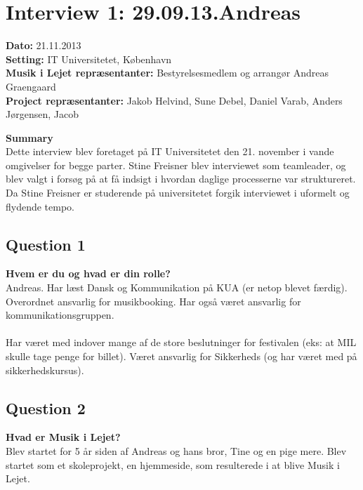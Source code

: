 \section{Interview 1: 29.09.13.Andreas}
\label{interview_1}

\textbf{Dato:} 21.11.2013 \\
\textbf{Setting:} IT Universitetet, København \\
\textbf{Musik i Lejet repræsentanter:} Bestyrelsesmedlem og arrangør Andreas Graengaard  \\
\textbf{Project repræsentanter:} Jakob Helvind, Sune Debel, Daniel Varab, Anders Jørgensen, Jacob 

\bigskip

\noindent \textbf{Summary} \\
Dette interview blev foretaget på IT Universitetet den 21. november i vande omgivelser for begge parter. Stine Freisner blev interviewet som teamleader, og blev valgt i forsøg på at få indsigt i hvordan daglige processerne var struktureret. Da Stine Freisner er studerende på universitetet forgik interviewet i uformelt og flydende tempo.


\subsection{Question 1}
\label{i1q1}
\noindent \textbf{Hvem er du og hvad er din rolle?} \\
Andreas. Har læst Dansk og Kommunikation på KUA (er netop blevet færdig). Overordnet ansvarlig for musikbooking. Har også været ansvarlig for kommunikationsgruppen. 
\\ \\
Har været med indover mange af de store beslutninger for festivalen (eks: at MIL skulle tage penge for billet). Været ansvarlig for Sikkerheds (og har været med på sikkerhedskursus). 

\subsection{Question 2}
\label{i1q2}
\noindent \textbf{Hvad er Musik i Lejet?} \\
Blev startet for 5 år siden af Andreas og hans bror, Tine og en pige mere. Blev startet som et skoleprojekt, en hjemmeside, som resulterede i at blive Musik i Lejet.

